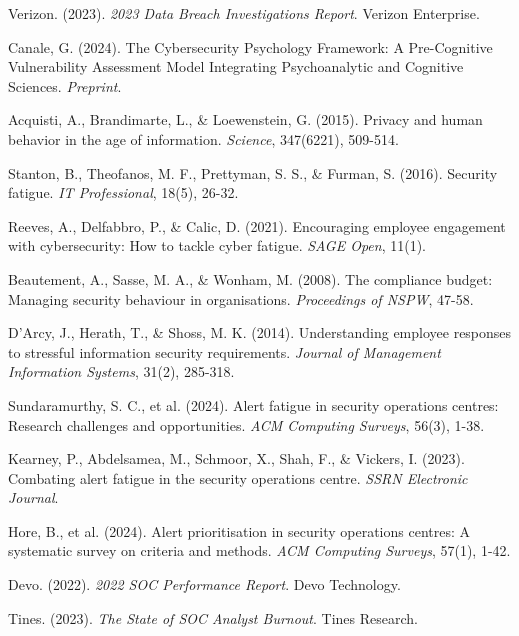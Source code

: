 \documentclass[11pt, a4paper]{article}
\begin{document}
\begin{thebibliography}{99}

Verizon. (2023). \textit{2023 Data Breach Investigations Report}. Verizon Enterprise.

Canale, G. (2024). The Cybersecurity Psychology Framework: A Pre-Cognitive Vulnerability Assessment Model Integrating Psychoanalytic and Cognitive Sciences. \textit{Preprint}.

Acquisti, A., Brandimarte, L., \& Loewenstein, G. (2015). Privacy and human behavior in the age of information. \textit{Science}, 347(6221), 509-514.

Stanton, B., Theofanos, M. F., Prettyman, S. S., \& Furman, S. (2016). Security fatigue. \textit{IT Professional}, 18(5), 26-32.

Reeves, A., Delfabbro, P., \& Calic, D. (2021). Encouraging employee engagement with cybersecurity: How to tackle cyber fatigue. \textit{SAGE Open}, 11(1).

Beautement, A., Sasse, M. A., \& Wonham, M. (2008). The compliance budget: Managing security behaviour in organisations. \textit{Proceedings of NSPW}, 47-58.

D'Arcy, J., Herath, T., \& Shoss, M. K. (2014). Understanding employee responses to stressful information security requirements. \textit{Journal of Management Information Systems}, 31(2), 285-318.

Sundaramurthy, S. C., et al. (2024). Alert fatigue in security operations centres: Research challenges and opportunities. \textit{ACM Computing Surveys}, 56(3), 1-38.

Kearney, P., Abdelsamea, M., Schmoor, X., Shah, F., \& Vickers, I. (2023). Combating alert fatigue in the security operations centre. \textit{SSRN Electronic Journal}.

Hore, B., et al. (2024). Alert prioritisation in security operations centres: A systematic survey on criteria and methods. \textit{ACM Computing Surveys}, 57(1), 1-42.

Devo. (2022). \textit{2022 SOC Performance Report}. Devo Technology.

Tines. (2023). \textit{The State of SOC Analyst Burnout}. Tines Research.


\end{thebibliography}
\end{document}
